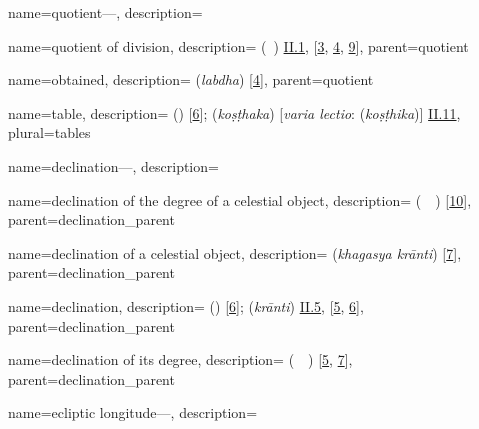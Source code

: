 {
        name={quotient---},
        description={\phantom{x}\nopagebreak}
}

{
        name={quotient of division},
        description={ (\kharij\idafaconsonant\ \qismat) \hyperlink{Pii1}{II.1}, [\hyperlink{PEpass3}{3}, \hyperlink{PEpass4}{4}, \hyperlink{PEpass9}{9}]},
        parent={quotient}
}

{
        name={obtained},
        description={ (\textit{labdha}) [\hyperlink{SEpass4}{4}]},
        parent={quotient}
}

{
        name={table},
        description={ (\jadval) [\hyperlink{PEpass6}{6}];  (\textit{koṣṭhaka}) [\textit{varia lectio}:  (\textit{koṣṭhika})]  \hyperlink{Sii11}{II.11}},
        plural={tables}
}        

{
        name={declination---},
        description={\phantom{x}\nopagebreak}
}

{
        name={declination of the degree of a celestial object},
        description={ (\mayl\idafaconsonant\ \daraji\idafavowel\ \kawkab) [\hyperlink{PEpass10}{10}]},
        parent={declination_parent}
}  

{
        name={declination of a celestial object},
        description={ (\textit{khagasya krānti}) [\hyperlink{SEpass7}{7}]},
        parent={declination_parent}
}

{
        name={declination},
        description={ (\mayl) [\hyperlink{PEpass6}{6}];  (\textit{krānti}) \hyperlink{Sii5}{II.5}, [\hyperlink{SEpass5}{5}, \hyperlink{SEpass6}{6}]},
        parent={declination_parent}
}

{
        name={declination of its degree},
        description={ (\mayl\idafaconsonant\ \daraji\idafavowel\ \uy) [\hyperlink{PEpass5}{5}, \hyperlink{PEpass7}{7}]},
        parent={declination_parent}
}        

{
        name={ecliptic longitude---},
        description={\phantom{x}\nopagebreak}
}


